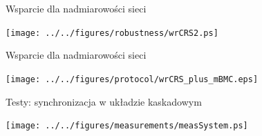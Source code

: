 \documentclass[compress,red]{beamer}
\begin{document}
\begin{frame}{Wsparcie dla nadmiarowości sieci}


  \begin{center}
  \texttt{[image: ../../figures/robustness/wrCRS2.ps]}
  \end{center}

\end{frame}
\begin{frame}{Wsparcie dla nadmiarowości sieci}


  \begin{center}
  \texttt{[image: ../../figures/protocol/wrCRS\_plus\_mBMC.eps]}
  \end{center}

\end{frame}
\begin{frame}{Testy: synchronizacja w układzie kaskadowym}

    \begin{center}
    \texttt{[image: ../../figures/measurements/measSystem.ps]}
    \end{center}

\end{frame}
\end{document}
